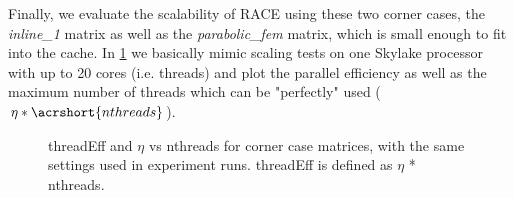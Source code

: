Finally, we evaluate the scalability of RACE using these two corner cases, the \emph{inline\_1} matrix as well as the \emph{parabolic\_fem} matrix, which is small enough to fit into the cache. 
In \cref{fig:corner_cases_param} we basically mimic scaling tests on one Skylake processor with up to 20 cores (i.e. threads) and plot the parallel efficiency as well as the maximum number of threads which can be "perfectly" used ($\eta*\acrshort{nthreads}$). 
%
\begin{figure}[tbhp]
	\centering
	\caption{\acrshort{threadEff} and $\eta$ vs \acrshort{nthreads} for corner case matrices, with the same settings used in experiment runs. \acrshort{threadEff} is defined as $\eta$ * \acrshort{nthreads}.}
	\label{fig:corner_cases_param}
\end{figure}

